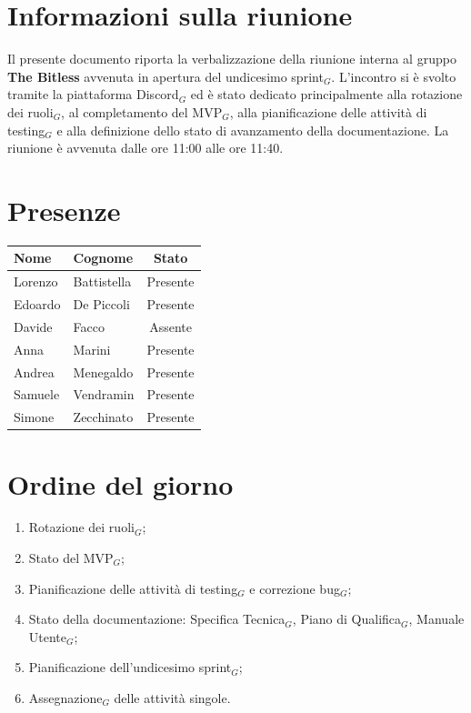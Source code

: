 \documentclass[a4paper, 10pt, colorlinks=true, linkcolor=black, urlcolor=blue, citecolor=blue, hidelinks]{article}
\begin{document}
\newcommand{\titolo}{Verbale interno}
\newcommand{\dataverbale}{2026-08-11}
\newcommand{\dataversione}{2026-08-11}
\newcommand{\versione}{1.0.0}
\newcommand{\stato}{Approvato}
\newcommand{\destinatari}{The Bitless, prof. Tullio Vardanega, prof. Riccardo Cardin}
\def\templatedir{../../../../templates}

\begin{titlepage}

\end{titlepage}

\newpage
\tableofcontents

\newpage
{}
\section{Informazioni sulla riunione}
Il presente documento riporta la verbalizzazione della riunione interna al gruppo \textbf{The Bitless} avvenuta in apertura del undicesimo sprint$_G$. L'incontro si è svolto tramite la piattaforma Discord$_G$ ed è stato dedicato principalmente alla rotazione dei ruoli$_G$, al completamento del MVP$_G$, alla pianificazione delle attività di testing$_G$ e alla definizione dello stato di avanzamento della documentazione. La riunione è avvenuta dalle ore 11:00 alle ore 11:40.

\section{Presenze}
\begin{center}
\begin{tabular}{|l|l|c|}
\hline
\textbf{Nome} & \textbf{Cognome} & \textbf{Stato} \\
\hline
Lorenzo & Battistella & Presente \\
Edoardo & De Piccoli & Presente \\
Davide & Facco & Assente \\
Anna & Marini & Presente \\
Andrea & Menegaldo & Presente \\
Samuele & Vendramin & Presente \\
Simone & Zecchinato & Presente \\
\hline
\end{tabular}
\end{center}

\section{Ordine del giorno}
\begin{enumerate}
    \item Rotazione dei ruoli$_G$;
    \item Stato del MVP$_G$;
    \item Pianificazione delle attività di testing$_G$ e correzione bug$_G$;
    \item Stato della documentazione: Specifica Tecnica$_G$, Piano di Qualifica$_G$, Manuale Utente$_G$;
    \item Pianificazione dell'undicesimo sprint$_G$;
    \item Assegnazione$_G$ delle attività singole.
\end{enumerate}
\end{document}
